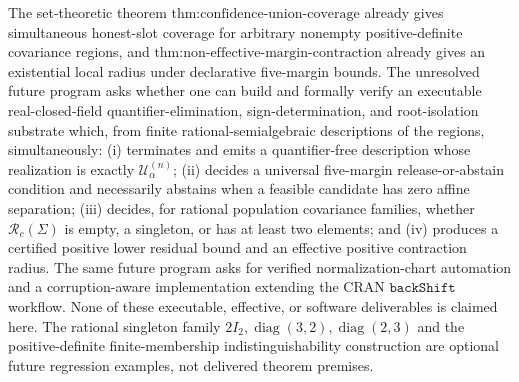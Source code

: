 The set-theoretic theorem \(\text{thm:confidence-union-coverage}\) already gives simultaneous honest-slot coverage for arbitrary nonempty positive-definite covariance regions, and \(\text{thm:non-effective-margin-contraction}\) already gives an existential local radius under declarative five-margin bounds. The unresolved future program asks whether one can build and formally verify an executable real-closed-field quantifier-elimination, sign-determination, and root-isolation substrate which, from finite rational-semialgebraic descriptions of the regions, simultaneously: (i) terminates and emits a quantifier-free description whose realization is exactly \(\mathcal U^{(n)}_\alpha\); (ii) decides a universal five-margin release-or-abstain condition and necessarily abstains when a feasible candidate has zero affine separation; (iii) decides, for rational population covariance families, whether \(\mathcal R_c(\Sigma)\) is empty, a singleton, or has at least two elements; and (iv) produces a certified positive lower residual bound and an effective positive contraction radius. The same future program asks for verified normalization-chart automation and a corruption-aware implementation extending the CRAN \(\texttt{backShift}\) workflow. None of these executable, effective, or software deliverables is claimed here. The rational singleton family \(2I_2,\operatorname{diag}(3,2),\operatorname{diag}(2,3)\) and the positive-definite finite-membership indistinguishability construction are optional future regression examples, not delivered theorem premises.